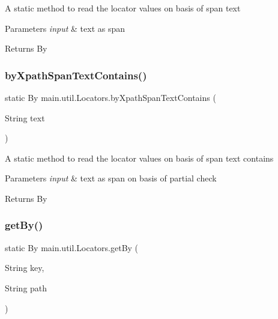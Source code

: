 A static method to read the locator values on basis of span text 
\begin{DoxyParams}{Parameters}
{\em input} & text as span \\
\hline
\end{DoxyParams}
\begin{DoxyReturn}{Returns}
By 
\end{DoxyReturn}
\mbox{\label{classmain_1_1util_1_1_locators_a8c86ef6c524f7ec696db7f81d6243211}} 
\subsubsection{\texorpdfstring{by\+Xpath\+Span\+Text\+Contains()}{byXpathSpanTextContains()}}
{\footnotesize\ttfamily static By main.\+util.\+Locators.\+by\+Xpath\+Span\+Text\+Contains (\begin{DoxyParamCaption}\item[{String}]{text }\end{DoxyParamCaption})\hspace{0.3cm}{\ttfamily [static]}}

A static method to read the locator values on basis of span text contains 
\begin{DoxyParams}{Parameters}
{\em input} & text as span on basis of partial check \\
\hline
\end{DoxyParams}
\begin{DoxyReturn}{Returns}
By 
\end{DoxyReturn}
\mbox{\label{classmain_1_1util_1_1_locators_abfccf35b881fdba5d096dfed34153a7e}} 
\subsubsection{\texorpdfstring{get\+By()}{getBy()}\hspace{0.1cm}{\footnotesize\ttfamily [1/2]}}
{\footnotesize\ttfamily static By main.\+util.\+Locators.\+get\+By (\begin{DoxyParamCaption}\item[{String}]{key,  }\item[{String}]{path }\end{DoxyParamCaption})\hspace{0.3cm}{\ttfamily [static]}}

